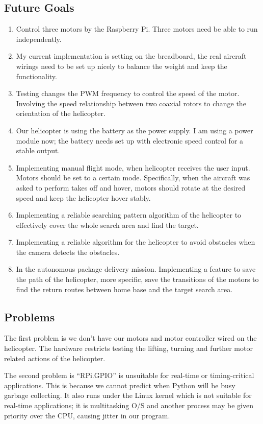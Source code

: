 \documentclass[letterpaper, 10, draftclsnofoot, onecolumn,compsoc]{IEEEtran}
\begin{document}
\subsection{Future Goals}
\begin{enumerate}
\item{Control three motors by the Raspberry Pi. Three motors need be able to run independently. }
\item{My current implementation is setting on the breadboard, the real aircraft wirings need to be set up nicely to balance the weight and keep the functionality.}
\item{Testing changes the PWM frequency to control the speed of the motor. Involving the speed relationship between two coaxial rotors to change the orientation of the helicopter.}
\item{Our helicopter is using the battery as the power supply. I am using a power module now; the battery needs set up with electronic speed control for a stable output. }
\item{Implementing manual flight mode, when helicopter receives the user input. Motors should be set to a certain mode. Specifically, when the aircraft was asked to perform takes off and hover, motors should rotate at the desired speed and keep the helicopter hover stably.}
\item{Implementing a reliable searching pattern algorithm of the helicopter to effectively cover the whole search area and find the target.}
\item{Implementing a reliable algorithm for the helicopter to avoid obstacles when the camera detects the obstacles.}
\item{In the autonomous package delivery mission. Implementing a feature to save the path of the helicopter, more specific, save the transitions of the motors to find the return routes between home base and the target search area.}
\end{enumerate}
\subsection{Problems}
The first problem is we don’t have our motors and motor controller wired on the helicopter. The hardware restricts testing the lifting, turning and further motor related actions of the helicopter.

The second problem is “RPi.GPIO” is unsuitable for real-time or timing-critical applications. This is because we cannot predict when Python will be busy garbage collecting. It also runs under the Linux kernel which is not suitable for real-time applications; it is multitasking O/S and another process may be given priority over the CPU, causing jitter in our program.
\end{document}
